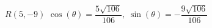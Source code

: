 {$R(5, -9)$}
{$\cos(\theta) = \dfrac{5\sqrt{106}}{106}, \; \sin(\theta) = -\dfrac{9\sqrt{106}}{106}$}